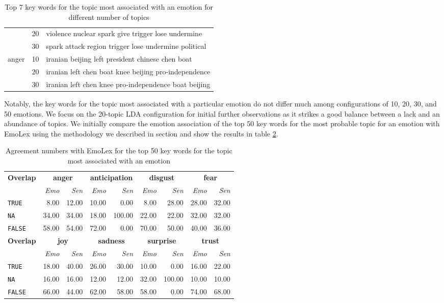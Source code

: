 \begin{table}[]
\begin{tabular}{l|r|l}
 & 20 & violence nuclear spark give trigger lose undermine\\
 & 30 & spark attack region trigger lose undermine political\\\hline
\multirow{3}{*}{anger} & 10 & iranian beijing left president chinese chen boat\\
 & 20 & iranian left chen boat knee beijing pro-independence\\
 & 30 & iranian left chen knee pro-independence boat beijing
\end{tabular}
\caption{Top 7 key words for the topic most associated with an emotion for different number of topics}
\label{tab:topic-key-words}
\end{table}

Notably, the key words for the topic most associated with a particular emotion do not differ much among configurations of 10, 20, 30, and 50 emotions. 
We focus on the 20-topic LDA configuration for initial further observations as it strikes a good balance between a lack and an abundance of topics.
We initially compare the emotion association of the top 50 key words for the most probable topic for an emotion with EmoLex using the methodology we described in section \label{sec:emolex-evaluation} and show the results in table \ref{tab:topics-emolex}.

\begin{table}[]
\centering
\begin{tabular}{l|rr|rr|rr|rr}
{\bf Overlap} & \multicolumn{2}{c}{{\bf anger}} & \multicolumn{2}{c}{{\bf anticipation}} & \multicolumn{2}{c}{{\bf disgust}} & \multicolumn{2}{c}{{\bf fear}} \\
 & {\it Emo} & {\it Sen} & {\it Emo} & {\it Sen} & {\it Emo} & {\it Sen} & {\it Emo} & {\it Sen} \\\hline
\texttt{TRUE} & 8.00 & 12.00 & 10.00 & 0.00 & 8.00 & 28.00 & 28.00 & 32.00 \\
\texttt{NA} & 34.00 & 34.00 & 18.00 & 100.00 & 22.00 & 22.00 & 32.00 & 32.00 \\
\texttt{FALSE} & 58.00 & 54.00 & 72.00 & 0.00 & 70.00 & 50.00 & 40.00 & 36.00 \\\hline
{\bf Overlap} & \multicolumn{2}{c}{{\bf joy}} & \multicolumn{2}{c}{{\bf sadness}} & \multicolumn{2}{c}{{\bf surprise}} & \multicolumn{2}{c}{{\bf trust}} \\
 & {\it Emo} & {\it Sen} & {\it Emo} & {\it Sen} & {\it Emo} & {\it Sen} & {\it Emo} & {\it Sen} \\\hline
\texttt{TRUE} & 18.00 & 40.00 & 26.00 & 30.00 & 10.00 & 0.00 & 16.00 & 22.00 \\
\texttt{NA} & 16.00 & 16.00 & 12.00 & 12.00 & 32.00 & 100.00 & 10.00 & 10.00 \\
\texttt{FALSE} & 66.00 & 44.00 & 62.00 & 58.00 & 58.00 & 0.00 & 74.00 & 68.00
\end{tabular}
\caption{Agreement numbers with EmoLex for the top 50 key words for the topic most associated with an emotion}
\label{tab:topics-emolex}
\end{table}

